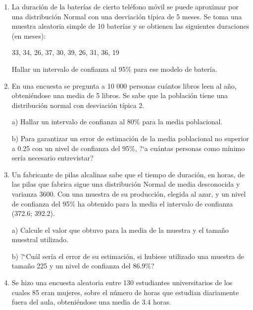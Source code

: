 \begin{adjustwidth}{20pt}{10pt}
\begin{enumerate}[PB. 1. ]
	\item 	La duración de la baterías de cierto teléfono móvil se puede aproximar por una distribución Normal con una desviación típica de 5 meses. Se toma una muestra aleatoria simple de 10 baterías y se obtienen las siguientes duraciones (en meses):
	
33, 34, 26, 37, 30, 39, 26, 31, 36, 19

Hallar un intervalo de confianza al 95\% para ese modelo de batería. 
		
		\hspace{-1cm}\vspace{1cm}
		
	\item 	En una encuesta se pregunta a 10 000 personas cuántos libros leen al año, obteniéndose una media de 5 libros. Se sabe que la población tiene una distribución normal con desviación típica 2.
	
a) Hallar un intervalo de confianza al 80\% para la media poblacional.

b) Para garantizar un error de estimación de la media poblacional no superior a 0.25 con un nivel de confianza del 95\%, ?`a cuántas personas como mínimo sería necesario
entrevistar?
		
		\hspace{-1cm}\vspace{1cm}
		
	\item 	Un fabricante de pilas alcalinas sabe que el tiempo de duración, en horas, de las pilas que fabrica sigue una distribución Normal de media desconocida y varianza 3600. Con una muestra de su producción, elegida al azar, y un nivel de confianza del 95\% ha obtenido para la media el intervalo de confianza (372.6; 392.2).
	
a) Calcule el valor que obtuvo para la media de la muestra y el tamaño muestral utilizado.

b) ?`Cuál sería el error de su estimación, si hubiese utilizado una muestra de tamaño 225 y un nivel de confianza del 86.9\%? 
		
		\hspace{-1cm}\vspace{1cm}
		
		
	\item 	Se hizo una encuesta aleatoria entre 130 estudiantes universitarios de los cuales 85 eran mujeres, sobre el número de horas que estudian diariamente fuera del aula, obteniéndose una media de 3.4 horas.
	

\end{enumerate}
\end{adjustwidth}
